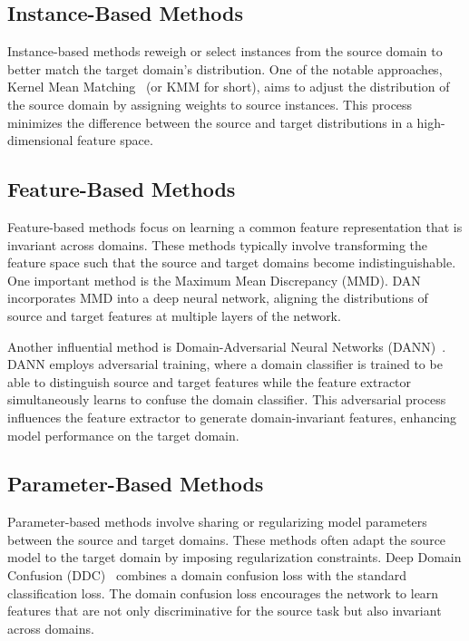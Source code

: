 \subsection{Instance-Based Methods}
 Instance-based methods reweigh or select instances from the source domain to better match the target domain's distribution. One of the notable approaches, Kernel Mean Matching~\cite{instanceMethod} (or KMM for short),  aims to adjust the distribution of the source domain by assigning weights to source instances. This process minimizes the difference between the  source and target distributions in a high-dimensional feature space.
 
 \subsection{Feature-Based Methods}
 Feature-based methods focus on learning a common feature representation that is invariant across domains. These methods typically involve transforming the feature space such that the source and target domains become indistinguishable. One important method is the Maximum Mean Discrepancy (MMD). DAN~\cite{featureMethod} incorporates MMD into a deep neural network, aligning the distributions of source and target features at multiple layers of the network. %
 
 Another influential method is Domain-Adversarial Neural Networks (DANN)~\cite{featureMethod2}. DANN employs adversarial training, where a domain classifier is trained to be able to distinguish source and target features while the feature extractor simultaneously learns to confuse the domain classifier. This adversarial process influences the feature extractor to generate domain-invariant features, enhancing model performance on the target domain.
 
 \subsection{Parameter-Based Methods}
 Parameter-based methods involve sharing or regularizing model parameters between the source and target domains. These methods often adapt the source model to the target domain by imposing regularization constraints. Deep Domain Confusion (DDC)~\cite{parameterMethod} combines a domain confusion loss with the standard classification loss. The domain confusion loss encourages the network to learn features that are not only discriminative for the source task but also invariant across domains. %

